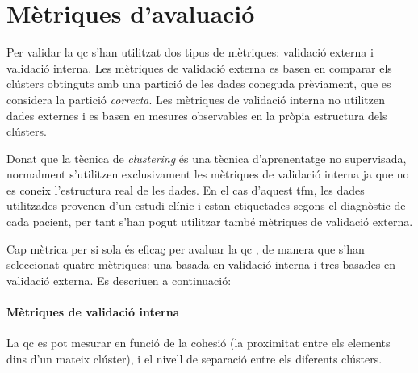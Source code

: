 \documentclass[CAT,BIB]{TFUOC}%
\begin{document}
    \section{Mètriques d'avaluació}
    \label{s:metrics}

        Per validar la \gls{qc}
        s'han utilitzat dos tipus de mètriques:
        validació externa i validació interna.
        Les mètriques de validació externa
        es basen en comparar els clústers obtinguts
        amb una partició de les dades coneguda prèviament,
        que es considera la partició \textit{correcta}.
        Les mètriques de validació interna
        no utilitzen dades externes i
        es basen en mesures observables
        en la pròpia estructura dels clústers.

        Donat que la tècnica de \textit{clustering}
        és una tècnica d'aprenentatge no supervisada,
        normalment s'utilitzen exclusivament les mètriques de validació interna
        ja que no es coneix l'estructura real de les dades.
        En el cas d'aquest \gls{tfm},
        les dades utilitzades provenen d'un estudi clínic
        i estan etiquetades segons el diagnòstic de cada pacient,
        per tant s'han pogut utilitzar també mètriques de validació externa.

        Cap mètrica per si sola és eficaç
        per avaluar la \gls{qc} \cite{Palacio-Nino2019},
        de manera que s'han seleccionat quatre mètriques:
        una basada en validació interna
        i tres basades en validació externa.
        Es descriuen a continuació:

        \paragraph{Mètriques de validació interna}
            La \gls{qc} es pot mesurar en funció de
            la cohesió
            (la proximitat entre els elements dins d'un mateix clúster),
            i el nivell de separació entre els diferents clústers.
\end{document}
